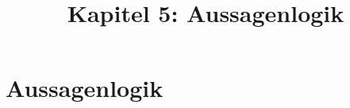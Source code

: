 \documentclass[18pt]{beamer}
\title[Aussagenlogik]{Kapitel 5: Aussagenlogik}
\begin{document}

\begin{frame}
 \titlepage
\end{frame}

\def\showSolutions{1}					 %

\section{Aussagenlogik}
\title[Aussagenlogik]{}

\end{document}
